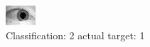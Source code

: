 \begin{figure}[h!]
\begin{center}
\includegraphics[width=0.60\columnwidth]{figures/ID1472_class_2_target_1.png}
\end{center}
\caption{ Classification: 2 actual target: 1}
\label{fig:ID1472_class_2_target_1}
\end{figure}
